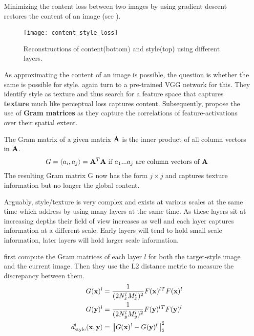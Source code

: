 
Minimizing the content loss between two images by using gradient descent restores the content of an image (see ).
\begin{figure}
    \texttt{[image: content\_style\_loss]}
    \caption[]{Reconstructions of content(bottom) and style(top) using different layers. \cite{gatys}}
\end{figure}

As approximating the content of an image is possible, the question is whether the same is possible for style.
\citeauthor*{gatys} again turn to a pre-trained VGG network for this.
They identify style as texture and thus search for a feature space that captures \textbf{texture} much like perceptual loss captures content.
Subsequently, \citeauthor*{gatys} propose the use of \textbf{Gram matrices} as they capture the correlations of feature-activations over their spatial extent.

The Gram matrix of a given matrix $\mathbf{A}$ is the inner product of all column vectors in $\mathbf{A}$.
\begin{align}
    G = \langle a_{i}, a_{j} \rangle = \mathbf{A}^T \mathbf{A} \text{ if $a_1$...$a_j$ are column vectors of $\mathbf{A}$}
\end{align}
The resulting Gram matrix G now has the form $j \times j$ and captures texture information but no longer the global content.

Arguably, style/texture is very complex and exists at various scales at the same time which \citeauthor*{gatys} address by using many layers at the same time.
As these layers sit at increasing depths their field of view increases as well and each layer captures information at a different scale.
Early layers will tend to hold small scale information, later layers will hold larger scale information.

\citeauthor*{gatys} first compute the Gram matrices of each layer $l$ for both the target-style image and the current image.
Then they use the L2 distance metric to measure the discrepancy between them.
\begin{align}
    G(\mathbf{x})^l & = \frac{1}{(2 N_x^l M_x^l)^2} F(\mathbf{x})^l{}^T F(\mathbf{x})^l \\
    G(\mathbf{y})^l & = \frac{1}{(2 N_y^l M_y^l)^2} F(\mathbf{y})^l{}^T F(\mathbf{y})^l \\
    d_{\text{style}}^l(\mathbf{x}, \mathbf{y}) & = \left\lVert G(\mathbf{x})^l - G(\mathbf{y})^l\right\rVert^2_2 \\
\end{align}


